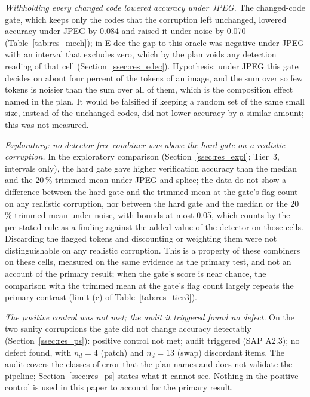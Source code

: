 \emph{Withholding every changed code lowered accuracy under JPEG.}
The changed-code gate, which keeps only the codes that the corruption left unchanged, lowered accuracy under JPEG by 0.084 and raised it
under noise by 0.070 (Table~\ref{tab:res_mech}); in E-dec the gap to this oracle was negative under JPEG with an interval that excludes
zero, which by the plan voids any detection reading of that cell (Section~\ref{ssec:res_edec}).
Hypothesis: under JPEG this gate decides on about four percent of the tokens of an image, and the sum over so few tokens is noisier than
the sum over all of them, which is the composition effect named in the plan.
It would be falsified if keeping a random set of the same small size, instead of the unchanged codes, did not lower accuracy by a similar
amount; this was not measured.

\emph{Exploratory: no detector-free combiner was above the hard gate on a realistic corruption.}
In the exploratory comparison (Section~\ref{ssec:res_expl}; Tier~3, intervals only), the hard gate gave higher verification accuracy
than the median and the 20\,\% trimmed mean under JPEG and splice; the data do not show a difference between the hard gate and the
trimmed mean at the gate's flag count on any realistic corruption, nor between the hard gate and the median or the 20\,\% trimmed mean
under noise, with bounds at most 0.05, which counts by the pre-stated rule as a finding against the added value of the detector on those
cells.
Discarding the flagged tokens and discounting or weighting them were not distinguishable on any realistic corruption.
This is a property of these combiners on these cells, measured on the same evidence as the primary test, and not an account of the
primary result; when the gate's score is near chance, the comparison with the trimmed mean at the gate's flag count largely repeats the
primary contrast (limit (c) of Table~\ref{tab:res_tier3}).

\emph{The positive control was not met; the audit it triggered found no defect.}
On the two sanity corruptions the gate did not change accuracy detectably (Section~\ref{ssec:res_ps}): positive control not met; audit
triggered (SAP A2.3); no defect found, with $n_d=4$ (patch) and $n_d=13$ (swap) discordant items.
The audit covers the classes of error that the plan names and does not validate the pipeline; Section~\ref{ssec:res_ps} states what
it cannot see.
Nothing in the positive control is used in this paper to account for the primary result.

